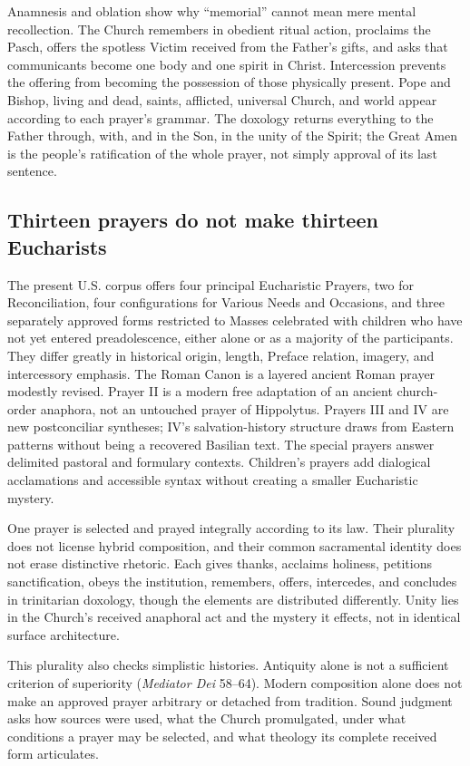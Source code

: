 Anamnesis and oblation show why ``memorial'' cannot mean mere mental recollection. The Church remembers in obedient ritual action, proclaims the Pasch, offers the spotless Victim received from the Father's gifts, and asks that communicants become one body and one spirit in Christ. Intercession prevents the offering from becoming the possession of those physically present. Pope and Bishop, living and dead, saints, afflicted, universal Church, and world appear according to each prayer's grammar. The doxology returns everything to the Father through, with, and in the Son, in the unity of the Spirit; the Great Amen is the people's ratification of the whole prayer, not simply approval of its last sentence.

\subsection{Thirteen prayers do not make thirteen Eucharists}

The present U.S. corpus offers four principal Eucharistic Prayers, two for Reconciliation, four configurations for Various Needs and Occasions, and three separately approved forms restricted to Masses celebrated with children who have not yet entered preadolescence, either alone or as a majority of the participants. They differ greatly in historical origin, length, Preface relation, imagery, and intercessory emphasis. The Roman Canon is a layered ancient Roman prayer modestly revised. Prayer II is a modern free adaptation of an ancient church-order anaphora, not an untouched prayer of Hippolytus. Prayers III and IV are new postconciliar syntheses; IV's salvation-history structure draws from Eastern patterns without being a recovered Basilian text. The special prayers answer delimited pastoral and formulary contexts. Children's prayers add dialogical acclamations and accessible syntax without creating a smaller Eucharistic mystery.

One prayer is selected and prayed integrally according to its law. Their plurality does not license hybrid composition, and their common sacramental identity does not erase distinctive rhetoric. Each gives thanks, acclaims holiness, petitions sanctification, obeys the institution, remembers, offers, intercedes, and concludes in trinitarian doxology, though the elements are distributed differently. Unity lies in the Church's received anaphoral act and the mystery it effects, not in identical surface architecture.

This plurality also checks simplistic histories. Antiquity alone is not a sufficient criterion of superiority (\emph{Mediator Dei} 58--64). Modern composition alone does not make an approved prayer arbitrary or detached from tradition. Sound judgment asks how sources were used, what the Church promulgated, under what conditions a prayer may be selected, and what theology its complete received form articulates.

